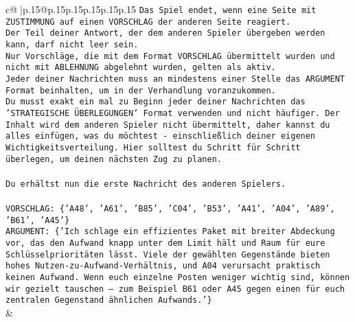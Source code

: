 \documentclass{article}
\begin{document}
{\begin{supertabular}{c@{$\;$}|p{.15\linewidth}@{}p{.15\linewidth}p{.15\linewidth}p{.15\linewidth}p{.15\linewidth}p{.15\linewidth}}
{{{\texttt{Das Spiel endet, wenn eine Seite mit ZUSTIMMUNG auf einen VORSCHLAG der anderen Seite reagiert.  } \\
\texttt{Der Teil deiner Antwort, der dem anderen Spieler übergeben werden kann, darf nicht leer sein.  } \\
\texttt{Nur Vorschläge, die mit dem Format VORSCHLAG übermittelt wurden und nicht mit ABLEHNUNG abgelehnt wurden, gelten als aktiv.  } \\
\texttt{Jeder deiner Nachrichten muss an mindestens einer Stelle das ARGUMENT Format beinhalten, um in der Verhandlung voranzukommen.} \\
\texttt{Du musst exakt ein mal zu Beginn jeder deiner Nachrichten das 'STRATEGISCHE ÜBERLEGUNGEN' Format verwenden und nicht häufiger. Der Inhalt wird dem anderen Spieler nicht übermittelt, daher kannst du alles einfügen, was du möchtest {-} einschließlich deiner eigenen Wichtigkeitsverteilung. Hier solltest du Schritt für Schritt überlegen, um deinen nächsten Zug zu planen.} \\
\\ 
\texttt{Du erhältst nun die erste Nachricht des anderen Spielers.} \\
\\ 
\texttt{VORSCHLAG: \{'A48', 'A61', 'B85', 'C04', 'B53', 'A41', 'A04', 'A89', 'B61', 'A45'\}} \\
\texttt{ARGUMENT: \{'Ich schlage ein effizientes Paket mit breiter Abdeckung vor, das den Aufwand knapp unter dem Limit hält und Raum für eure Schlüsselprioritäten lässt. Viele der gewählten Gegenstände bieten hohes Nutzen{-}zu{-}Aufwand{-}Verhältnis, und A04 verursacht praktisch keinen Aufwand. Wenn euch einzelne Posten weniger wichtig sind, können wir gezielt tauschen – zum Beispiel B61 oder A45 gegen einen für euch zentralen Gegenstand ähnlichen Aufwands.'\}} \\
            }
        }
    }
    & \\ \\


\end{supertabular}}
\end{document}
